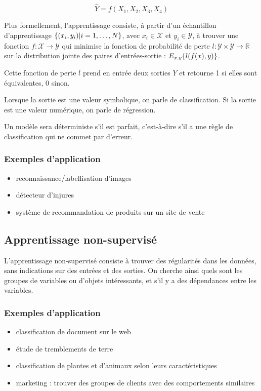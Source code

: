		$$\hat{Y} = f(X_1, X_2, X_3, X_4)$$

		Plus formellement, l'apprentissage consiste, à partir d'un échantillon d'apprentissage $\lbrace (x_i, y_i) \vert i = 1, \dots , N \rbrace$, avec $x_i \in \mathcal{X}$ et $y_i \in \mathcal{Y}$, à trouver une fonction $f : \mathcal{X} \rightarrow \mathcal{Y}$ qui minimise la fonction de probabilité de perte $l : \mathcal{Y} \times \mathcal{Y} \rightarrow \mathbb{R}$ sur la distribution jointe des paires d'entrées-sortie : $E_{x, y} \lbrace l(f(x), y) \rbrace$.

		Cette fonction de perte $l$ prend en entrée deux sorties $Y$ et retourne 1 si elles sont équivalentes, 0 sinon.

		Lorsque la sortie est une valeur symbolique, on parle de classification. Si la sortie est une valeur numérique, on parle de régression.

		Un modèle sera déterministe s'il est parfait, c'est-à-dire s'il a une règle de classification qui ne commet par d'erreur.
		
		\subsubsection{Exemples d'application}
			
			\begin{itemize}
				\item reconnaissance/labellisation d'images
				\item détecteur d'injures
				\item système de recommandation de produits sur un site de vente
			\end{itemize}
		
		
		\subsection{Apprentissage non-supervisé}
		
		L'apprentissage non-supervisé consiste à trouver des régularités dans les données, sans indications sur des entrées et des sorties. On cherche ainsi quels sont les groupes de variables ou d'objets intéressants, et s'il y a des dépendances entre les variables.
		
			\subsubsection{Exemples d'application}
			
			\begin{itemize}
				\item classification de document sur le web
				\item étude de tremblements de terre
				\item classification de plantes et d'animaux selon leurs caractéristiques
				\item marketing : trouver des groupes de clients avec des comportements similaires
			\end{itemize}
		
